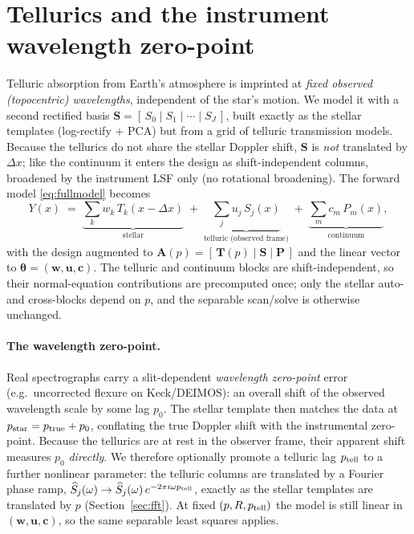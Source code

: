 \documentclass[11pt]{article}
\newcommand{\dx}{\Delta x}                     %
\begin{document}
\section{Tellurics and the instrument wavelength zero-point}
\label{sec:tellurics}
Telluric absorption from Earth's atmosphere is imprinted at \emph{fixed observed
(topocentric) wavelengths}, independent of the star's motion. We model it with a
second rectified basis $\mathbf{S}=[\,S_0\mid S_1\mid\cdots\mid S_J\,]$, built
exactly as the stellar templates (log-rectify $+$ PCA) but from a grid of telluric
transmission models. Because the tellurics do not share the stellar Doppler shift,
$\mathbf{S}$ is \emph{not} translated by $\dx$; like the continuum it enters the
design as shift-independent columns, broadened by the instrument LSF only (no
rotational broadening). The forward model \eqref{eq:fullmodel} becomes
\begin{equation}
  Y(x) \;=\; \underbrace{\sum_{k} w_k\,T_k(x-\dx)}_{\text{stellar}}
  \;+\; \underbrace{\sum_{j} u_j\,S_j(x)}_{\text{telluric (observed frame)}}
  \;+\; \underbrace{\sum_{m} c_m\,P_m(x)}_{\text{continuum}},
\end{equation}
with the design augmented to
$\mathbf{A}(p)=[\,\mathbf{T}(p)\mid\mathbf{S}\mid\mathbf{P}\,]$ and the linear vector
to $\boldsymbol\theta=(\mathbf{w},\mathbf{u},\mathbf{c})$. The telluric and continuum
blocks are shift-independent, so their normal-equation contributions are precomputed
once; only the stellar auto- and cross-blocks depend on $p$, and the separable
scan/solve is otherwise unchanged.

\paragraph{The wavelength zero-point.}
Real spectrographs carry a slit-dependent \emph{wavelength zero-point} error (e.g.\
uncorrected flexure on Keck/DEIMOS): an overall shift of the observed wavelength
scale by some lag $p_0$. The stellar template then matches the data at
$p_{\rm star}=p_{\rm true}+p_0$, conflating the true Doppler shift with the
instrumental zero-point. Because the tellurics are at rest in the observer frame,
their apparent shift measures $p_0$ \emph{directly}. We therefore optionally promote
a telluric lag $p_{\rm tell}$ to a further nonlinear parameter: the telluric columns
are translated by a Fourier phase ramp,
$\widehat{S}_j(\omega)\to\widehat{S}_j(\omega)\,e^{-2\pi i\omega p_{\rm tell}}$,
exactly as the stellar templates are translated by $p$ (Section~\ref{sec:fft}). At
fixed $(p,R,p_{\rm tell})$ the model is still linear in
$(\mathbf{w},\mathbf{u},\mathbf{c})$, so the same separable least squares applies.
\end{document}
